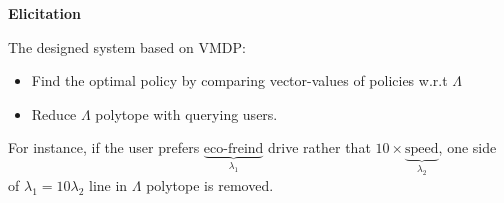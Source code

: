 \documentclass{beamer}
\begin{document}

\begin{frame}
\begin{center}
 \textbf{Elicitation}
\end{center}
\end{frame}


\begin{frame}

The designed system based on VMDP:
\begin{itemize}
\item Find the optimal policy by comparing vector-values of policies w.r.t $\Lambda$
\item Reduce $\Lambda$ polytope with querying users.
\end{itemize}
\alert{For instance}, if the user prefers $\underbrace{\text{eco-freind}}_{\lambda_1}$ drive rather that $10 \times \underbrace{\text{speed}}_{\lambda_2}$, one side of $\lambda_1 = 10 \lambda_2$ line in $\Lambda$ polytope is removed. 

\begin{figure}[h!]
\centering
{}    
\end{figure}

\end{frame}
\end{document}
